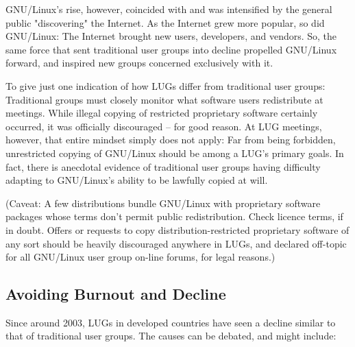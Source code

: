 GNU/Linux's rise, however, coincided with and was intensified by the
general public "discovering" the Internet. As the Internet grew more
popular, so did GNU/Linux: The Internet brought new users,
developers, and vendors. So, the same force that sent traditional user
groups into decline propelled GNU/Linux forward, and inspired new groups 
concerned exclusively with it. 

To give just one indication of how LUGs differ from traditional 
user groups: Traditional groups must closely 
monitor what software users redistribute at meetings.
While illegal copying of restricted proprietary software certainly
occurred, it was officially discouraged -- for good reason.
At LUG meetings, however, that entire mindset simply does not apply:
Far from being forbidden, unrestricted copying of GNU/Linux
should be among a LUG's primary goals.  In fact, there is anecdotal
evidence of traditional user groups having difficulty adapting to
GNU/Linux's ability to be lawfully copied at will.

(Caveat:  A few distributions bundle GNU/Linux with proprietary
software packages whose terms don't permit public redistribution.
Check licence terms, if in doubt.  Offers or requests to copy 
distribution-restricted proprietary software of any sort should be
heavily discouraged anywhere in LUGs, and declared off-topic for all 
GNU/Linux user group on-line forums, for legal reasons.)




\subsection{Avoiding Burnout and Decline}

Since around 2003, LUGs in developed countries have seen a decline
similar to that of traditional user groups.  The causes can be debated,
and might include:


